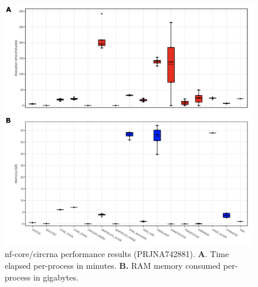 \documentclass{bmcart}
\begin{document}
\begin{figure}[h!]
    \includegraphics[width=12.25cm]{figure4.png}
    \vspace{-10mm}
    \caption{nf-core/circrna performance results (PRJNA742881). \textbf{A}. Time elapsed per-process in minutes. \textbf{B.} RAM memory consumed per-process in gigabytes.}
    \label{fig:4}
\end{figure}
\end{document}
